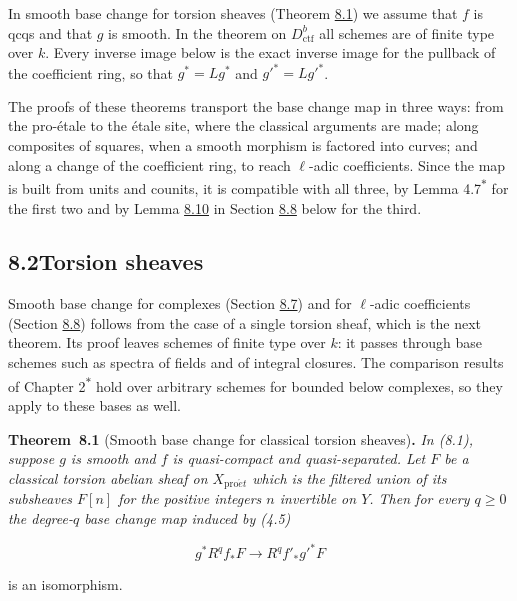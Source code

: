 \documentclass[11pt]{article}
\newenvironment{bpstatement}[2]{\par\addvspace{0.6\baselineskip}\noindent\textbf{#1}#2\textbf{.}\enspace\ignorespaces}
  {\par\addvspace{0.4\baselineskip}}
\newenvironment{bpstatementit}[2]{\begin{bpstatement}{#1}{#2}\itshape\ignorespaces}{\end{bpstatement}}
\newcommand{\bpout}[1]{#1\textsuperscript{\hyperlink{bp-outside}{\ensuremath{\ast}}}}
\begin{document}
In smooth base change for torsion sheaves (Theorem \hyperref[bp7]{8.1}) we assume that \(f\) is qcqs and that \(g\) is smooth. In the theorem on \(D^b_{\mathrm{ctf}}\) all schemes are of finite type over \(k\). Every inverse image below is the exact inverse image for the pullback of the coefficient ring, so that \(g^*=Lg^*\) and \(g'^*=Lg'^*\).

The proofs of these theorems transport the base change map in three ways: from the pro-étale to the étale site, where the classical arguments are made; along composites of squares, when a smooth morphism is factored into curves; and along a change of the coefficient ring, to reach \(\ell\)-adic coefficients. Since the map is built from units and counits, it is compatible with all three, by Lemma \bpout{4.7} for the first two and by Lemma \hyperref[bp43]{8.10} in Section \hyperref[bp41]{8.8} below for the third.


\subsection*{\texorpdfstring{8.2\quad Torsion sheaves}{8.2 Torsion sheaves}}
\label{bp5}%
\label{bp6}%
Smooth base change for complexes (Section \hyperref[bp36]{8.7}) and for \(\ell\)-adic coefficients (Section \hyperref[bp41]{8.8}) follows from the case of a single torsion sheaf, which is the next theorem. Its proof leaves schemes of finite type over \(k\): it passes through base schemes such as spectra of fields and of integral closures. The comparison results of Chapter \bpout{2} hold over arbitrary schemes for bounded below complexes, so they apply to these bases as well.

\label{bp7}%
\begin{bpstatementit}{Theorem~8.1}{ (Smooth base change for classical torsion sheaves)}
In (8.1), suppose \(g\) is smooth and \(f\) is quasi-compact and quasi-separated. Let \(F\) be a classical torsion abelian sheaf on \(X_{\mathrm{pro}\acute{e}t}\) which is the filtered union of its subsheaves \(F[n]\) for the positive integers \(n\) invertible on \(Y\). Then for every \(q\geq0\) the degree-\(q\) base change map induced by (4.5)

\[
g^*R^qf_*F\longrightarrow R^qf'_*g'^*F
\]

is an isomorphism.
\end{bpstatementit}
\end{document}

